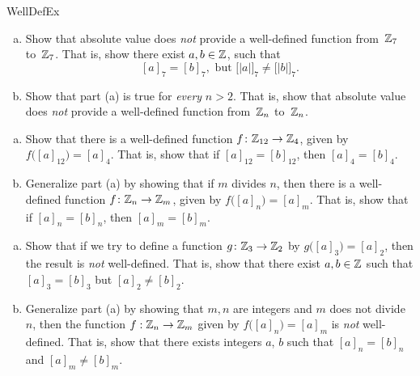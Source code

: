 \begin{exercise}{WellDefEx}
\begin{enumerate}[(a)]
\item  \label{WellDefEx-AbsVal0}
 Show that absolute value does \emph{not} provide a well-defined function from~$\mathbb{Z}_7$ to~$\mathbb{Z}_7$. That is, show there exist $a,b \in \mathbb{Z}$, such that 
\[ [a]_7 = [b]_7, \text{ but } \bigl[ |a| \bigr]_7 \neq \bigl[ |b| \bigr]_7.\]
\item  \label{WellDefEx-AbsVal}
 Show that part (a) is true for \emph{every} $n > 2$. That is, show that  absolute value does \emph{not} provide a well-defined function from~$\mathbb{Z}_n$ to~$\mathbb{Z}_n$. 
\end{enumerate}
\end{exercise}

\begin{exercise}{57}
\begin{enumerate}[(a)]
\item
Show that there is a well-defined function 
$f \colon \mathbb{Z}_{12} \to \mathbb{Z}_{4}$, given by \\
$ f \bigl( [a]_{12} \bigr) = [a]_{4}$. 
That is, show that if $[a]_{12} = [b]_{12}$, then $ [a]_4  = [b]_4$.
\item  \label{WellDefEx-divide}
Generalize part (a) by showing that if $m$ divides $n$, then there is a well-defined function 
$f \colon \mathbb{Z}_n \to \mathbb{Z}_m$, given by $f \bigl( [a]_n \bigr) = [a]_m$.
That is, show that if $[a]_n = [b]_n$, then $ [a]_m =  [b]_m$.
\end{enumerate}
\end{exercise}

\begin{exercise}{}
\begin{enumerate}[(a)]
\item  \label{WellDefEx-odd2}
 Show that if we try to define a function $g \colon \mathbb{Z}_3 \to \mathbb{Z}_2$ by $g \bigl( [a]_3 \bigr) = [a]_2$, then the result is \emph{not} well-defined. That is, show that there exist $a, b \in \mathbb{Z}$ such that
$[a]_3 = [b]_3$  but $[a]_2 \neq [b]_2.$
\item
Generalize part (a) by showing that $m, n$ are integers and $m$ does not divide $n$, then the function 
$f: \mathbb{Z}_n \to \mathbb{Z}_m$  given by $f \bigl( [a]_n \bigr) = [a]_m$ is \emph{not} well-defined.
That is, show that there exists integers $a$, $b$ such that $[a]_n = [b]_n$ and $ [a]_m \neq   [b]_m$.
\end{enumerate}
\end{exercise}


